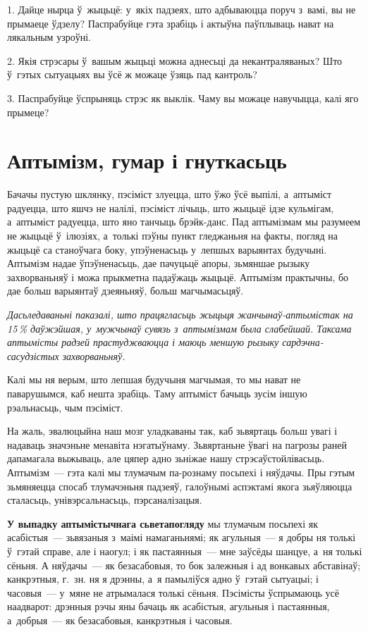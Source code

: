 1. Дайце нырца ў~жыцьцё: у~якіх падзеях, што адбываюцца поруч з~вамі, вы не прымаеце ўдзелу? Паспрабуйце гэта зрабіць і актыўна паўплываць нават на лякальным узроўні.

2. Якія стрэсары ў~вашым жыцьці можна аднесьці да некантраляваных? Што ў~гэтых сытуацыях вы ўсё ж можаце ўзяць пад кантроль?

3. Паспрабуйце ўспрыняць стрэс як выклік. Чаму вы можаце навучыцца, калі яго прымеце?


\section{Аптымізм, гумар і гнуткасьць}

Бачачы пустую шклянку, пэсіміст злуецца, што ўжо ўсё выпілі, а~аптыміст радуецца, што яшчэ не налілі, пэсіміст лічыць, што жыцьцё ідзе кульмігам, а~аптыміст радуецца, што яно танчыць брэйк-данс. Пад аптымізмам мы разумеем не жыцьцё ў~ілюзіях, а~толькі пэўны пункт гледжаньня на факты, погляд на жыцьцё са станоўчага боку, упэўненасьць у~лепшых варыянтах будучыні. Аптымізм надае ўпэўненасьць, дае пачуцьцё апоры, зьмяншае рызыку захворваньняў і можа прыкметна падаўжаць жыцьцё. Аптымізм практычны, бо дае больш варыянтаў дзеяньняў, больш магчымасьцяў.

\emph{Дасьледаваньні паказалі, што працягласьць жыцьця жанчынаў-аптымістак на 15\,\% даўжэйшая, у~мужчынаў сувязь з~аптымізмам была слабейшай. Таксама аптымісты радзей прастуджваюцца і маюць меншую рызыку сардэчна-сасудзістых захворваньняў.}

Калі мы ня верым, што лепшая будучыня магчымая, то мы нават не паварушымся, каб нешта зрабіць. Таму аптыміст бачыць зусім іншую рэальнасьць, чым пэсіміст. 


На жаль, эвалюцыйна наш мозг уладкаваны так, каб зьвяртаць больш увагі і надаваць значэньне менавіта нэгатыўнаму. Зьвяртаньне ўвагі на пагрозы раней дапамагала выжываць, але цяпер адно зьніжае нашу стрэсаўстойлівасьць. Аптымізм~--- гэта калі мы тлумачым па-рознаму посьпехі і няўдачы. Пры гэтым зьмяняецца спосаб тлумачэньня падзеяў, галоўнымі аспэктамі якога зьяўляюцца сталасьць, унівэрсальнасьць, пэрсаналізацыя. 

\textbf{У выпадку аптымістычнага сьветапогляду} мы тлумачым посьпехі як асабістыя~--- зьвязаныя з~маімі намаганьнямі; як агульныя~--- я добры ня толькі ў~гэтай справе, але і наогул; і як пастаянныя~--- мне заўсёды шанцуе, а~ня толькі сёньня. А няўдачы~--- як безасабовыя, то бок залежныя і ад вонкавых абставінаў; канкрэтныя, г.~зн. ня я дрэнны, а~я памыліўся адно ў~гэтай сытуацыі; і часовыя~--- у~мяне не атрымалася толькі сёньня. Пэсімісты ўспрымаюць усё наадварот: дрэнныя рэчы яны бачаць як асабістыя, агульныя і пастаянныя, а~добрыя~--- як безасабовыя, канкрэтныя і часовыя.

